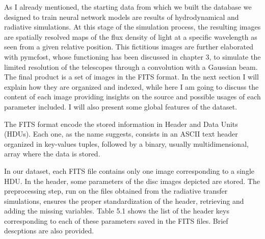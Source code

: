 \documentclass[a4paper,10pt]{report}
\begin{document}
As I already mentioned, the starting data from which we built the database 
we designed to train neural network models are results
of hydrodynamical and radiative simulations.
At this stage of the simulation process, the resulting images
are spatially resolved maps of the flux density of light at a specific wavelength as seen 
from a given relative position.
This fictitious images are further elaborated with pymcfost,
whose functioning has been discussed in chapter 3, to simulate the limited resolution of
the telescopes through a convolution with a Gaussian beam.
The final product is a set of images in the FITS format. In the next section I will explain how they are organized
and indexed, while here I am going to discuss the content of each image providing insights on the source and
possible usages of each parameter included. I will also present some global features of the dataset.

The FITS format encode the stored information in Header and Data Units (HDUs).
Each one, as the name suggests, consists in an ASCII text header organized in key-values tuples, followed 
by a binary, usually multidimensional, array where the data is stored.

In our dataset, each FITS file contains only one image corresponding to a single HDU.
In the header, some parameters of the disc images depicted are stored. 
The preprocessing step, run on the files obtained from the radiative transfer simulations, ensures
the proper standardization of the header, retrieving and adding the missing variables.
Table 5.1 shows the list of the header keys corresponding to each of these parameters
saved in the FITS files. Brief descptions are also provided.
\end{document}
